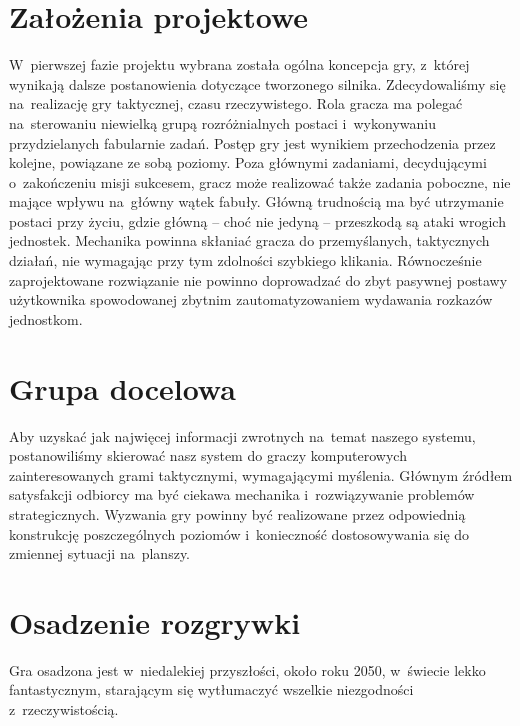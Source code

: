 \documentclass[licencjacka]{pracamgr}
\begin{document}
  \section{Założenia projektowe}
    W~pierwszej fazie projektu wybrana została ogólna koncepcja gry, z~której wynikają dalsze postanowienia dotyczące
    tworzonego silnika. Zdecydowaliśmy się na~realizację gry taktycznej, czasu rzeczywistego. Rola gracza ma polegać
    na~sterowaniu niewielką grupą rozróżnialnych postaci i~wykonywaniu przydzielanych fabularnie zadań. Postęp gry jest 
    wynikiem przechodzenia przez kolejne, powiązane ze sobą poziomy. Poza głównymi zadaniami, decydującymi o~zakończeniu
    misji sukcesem, gracz może realizować także zadania poboczne, nie mające wpływu na~główny wątek fabuły. Główną
    trudnością ma być utrzymanie postaci przy życiu, gdzie główną -- choć nie jedyną -- przeszkodą są ataki wrogich jednostek.
    Mechanika powinna skłaniać gracza do przemyślanych, taktycznych działań, nie wymagając przy tym zdolności szybkiego klikania. 
    Równocześnie zaprojektowane rozwiązanie nie powinno doprowadzać do zbyt pasywnej postawy użytkownika spowodowanej zbytnim
    zautomatyzowaniem wydawania rozkazów jednostkom.

  \section{Grupa docelowa}
    Aby uzyskać jak najwięcej informacji zwrotnych na~temat naszego systemu, postanowiliśmy skierować nasz system do
    graczy komputerowych zainteresowanych grami taktycznymi, wymagającymi myślenia. Głównym źródłem satysfakcji
    odbiorcy ma być ciekawa mechanika i~rozwiązywanie problemów strategicznych. Wyzwania gry powinny być realizowane przez
    odpowiednią konstrukcję poszczególnych poziomów i~konieczność dostosowywania się do zmiennej sytuacji na~planszy.

  \section{Osadzenie rozgrywki}
    Gra osadzona jest w~niedalekiej przyszłości, około roku 2050, w~świecie lekko fantastycznym, starającym się wytłumaczyć
    wszelkie niezgodności z~rzeczywistością. 
\end{document}
